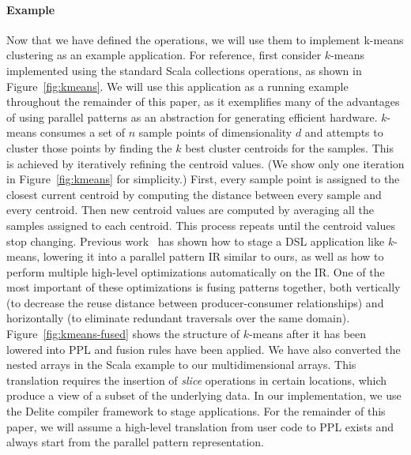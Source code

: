 \paragraph{Example}
Now that we have defined the operations, we will use them to implement k-means clustering as an example application.
For reference, first consider $k$-means implemented using the standard Scala collections operations, as shown in Figure~\ref{fig:kmeans}.
We will use this application as a running example throughout the remainder of this paper, as it exemplifies many of the advantages of using parallel patterns as an abstraction for generating efficient hardware.
$k$-means consumes a set of $n$ sample points of dimensionality $d$ and attempts to cluster those points by finding the $k$ best cluster centroids for the samples.
This is achieved by iteratively refining the centroid values.
(We show only one iteration in Figure~\ref{fig:kmeans} for simplicity.)
First, every sample point is assigned to the closest current centroid by computing the distance between every sample and every centroid.
Then new centroid values are computed by averaging all the samples assigned to each centroid.
This process repeats until the centroid values stop changing.
Previous work~\cite{rompf12optimizing,brown16clusters,chambers10flumejava} has shown how to stage a DSL application like $k$-means, lowering it into a parallel pattern IR similar to ours, as well as how to perform multiple high-level optimizations automatically on the IR.
One of the most important of these optimizations is fusing patterns together, both vertically (to decrease the reuse distance between producer-consumer relationships) and horizontally (to eliminate redundant traversals over the same domain).
Figure~\ref{fig:kmeans-fused} shows the structure of $k$-means after it has been lowered into PPL and fusion rules have been applied.
We have also converted the nested arrays in the Scala example to our multidimensional arrays.
This translation requires the insertion of \emph{slice} operations in certain locations, which produce a view of a subset of the underlying data.
In our implementation, we use the Delite compiler framework \cite{delite-tecs14} to stage applications. For the remainder of this paper, we will assume a high-level translation from user code to PPL exists and always start from the parallel pattern representation.
